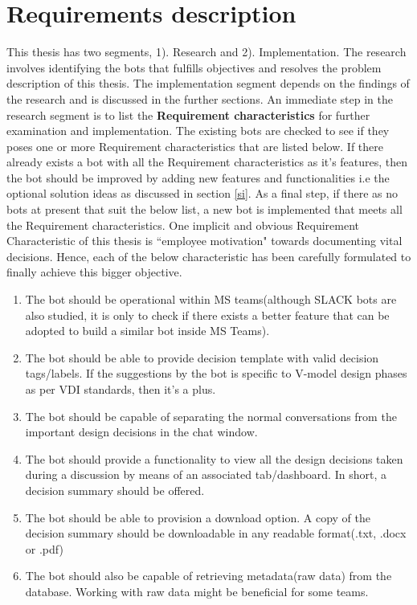 \section{Requirements description}
\label{rd}
This thesis has two segments, 1). Research and 2). Implementation. The research involves identifying the bots that fulfills objectives and resolves the problem description of this thesis. The implementation segment depends on the findings of the research and is discussed in the further sections. An immediate step in the research segment is to list the \textbf{Requirement characteristics} for further examination and implementation. The existing bots are checked to see if they poses one or more Requirement characteristics that are listed below. If there already exists a bot with all the Requirement characteristics as it's features, then the bot should be improved by adding new features and functionalities i.e the optional solution ideas as discussed in section \ref{si}. As a final step, if there as no bots at present that suit the below list, a new bot is implemented that meets all the Requirement characteristics. One implicit and obvious Requirement Characteristic of this thesis is ``employee motivation" towards documenting vital decisions. Hence, each of the below characteristic has been carefully formulated to finally achieve this bigger objective.
\begin{enumerate}
\item The bot should be operational within MS teams(although SLACK bots are also studied, it is only to check if there exists a better feature that can be adopted to build a similar bot inside MS Teams).

\item The bot should be able to provide decision template with valid decision tags/labels. If the suggestions by the bot is specific to V-model design phases as per VDI standards, then it's a plus.
\item The bot should be capable of separating the normal conversations from the important design decisions in the chat window.
\item The bot should provide a functionality to view all the design decisions taken during a discussion by means of an associated tab/dashboard. In short, a decision summary should be offered. 
\item The bot should be able to provision a download option. A copy of the decision summary should be downloadable in any readable format(.txt, .docx or .pdf)
\item The bot should also be capable of retrieving metadata(raw data) from the database. Working with raw data might be beneficial for some teams. 
\end{enumerate}

